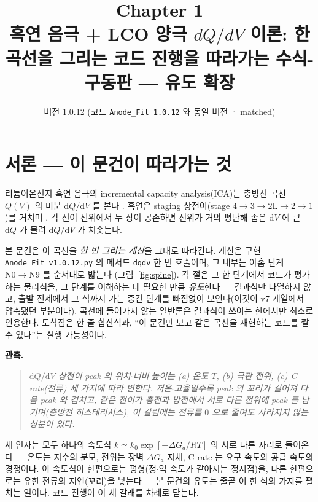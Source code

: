\documentclass[11pt,a4paper]{article}
\title{\textbf{\LARGE Chapter 1}\\[0.35em]\Large 흑연 음극 + LCO 양극 $dQ/dV$ 이론: 한 곡선을 그리는 코드 진행을 따라가는 수식-구동판 — 유도 확장}
\author{}
\date{\normalsize 버전 1.0.12 \quad(코드 \texttt{Anode\_Fit 1.0.12} 와 동일 버전 · matched)}
\newcommand{\dd}{\mathrm{d}}
\newcommand{\code}[1]{\texttt{#1}}
\begin{document}
\maketitle

\section*{서론 — 이 문건이 따라가는 것}
리튬이온전지 흑연 음극의 incremental capacity analysis(ICA)는 충방전 곡선 $Q(V)$ 의 미분
$\dd Q/\dd V$ 를 본다 \cite{bloom2005,dubarry2012}. 흑연은 staging 상전이(stage
$4\!\to\!3\!\to\!2\mathrm L\!\to\!2\!\to\!1$)를 거치며 \cite{dahn1991,ohzuku1993}, 각 전이 전위에서
두 상이 공존하면 전위가 거의 평탄해 좁은 $\dd V$ 에 큰 $\dd Q$ 가 몰려 $\dd Q/\dd V$ 가 치솟는다.

본 문건은 이 곡선을 \emph{한 번 그리는 계산}을 그대로 따라간다. 계산은 구현 \code{Anode\_Fit\_v1.0.12.py}
의 메서드 \code{dqdv} 한 번 호출이며, 그 내부는 아홉 단계 $\mathrm N0\!\to\!\mathrm N9$ 를 순서대로 밟는다
(그림~\ref{fig:spine}). 각 절은 그 한 단계에서 코드가 평가하는 물리식을, 그 단계를 이해하는 데 필요한 만큼
\emph{유도}한다 — 결과식만 나열하지 않고, 출발 전제에서 그 식까지 가는 중간 단계를 빠짐없이 보인다(이것이 v7
계열에서 압축됐던 부분이다). 곡선에 들어가지 않는 일반론은 결과식이 쓰이는 한에서만 최소로 인용한다. 도착점은 한 줄
합산식과, ``이 문건만 보고 같은 곡선을 재현하는 코드를 짤 수 있다''는 실행 가능성이다.

\textbf{관측.}
\begin{quote}\itshape
$\dd Q/\dd V$ 상전이 peak 의 위치$\cdot$너비$\cdot$높이는 (a) 온도 $T$, (b) 극판 전위, (c) C-rate(전류)
세 가지에 따라 변한다. 저온$\cdot$고율일수록 peak 의 꼬리가 길어져 다음 peak 와 겹치고, 같은 전이가 충전과 방전에서
서로 다른 전위에 peak 를 남기며(충방전 히스테리시스), 이 갈림에는 전류를 $0$ 으로 줄여도 사라지지 않는 성분이 있다.
\end{quote}

세 인자는 모두 하나의 속도식 $k\simeq k_0\exp[-\Delta G_a/RT]$ 의 서로 다른 자리로 들어온다 — 온도는 지수의 분모,
전위는 장벽 $\Delta G_a$ 자체, C-rate 는 요구 속도와 공급 속도의 경쟁이다. 이 속도식이 한편으로는 평형(정$\cdot$역
속도가 같아지는 정지점)을, 다른 한편으로는 유한 전류의 지연(꼬리)을 낳는다 — 본 문건의 유도는 줄곧 이 한 식의 가지를
펼치는 일이다. 코드 진행이 이 세 갈래를 차례로 닫는다.
\end{document}
